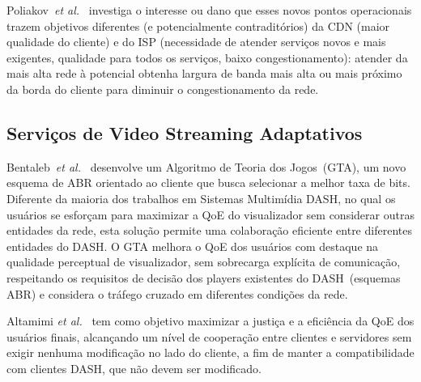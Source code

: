 Poliakov~\textit{et al.}~\cite{poliakovPHD2018} 
investiga o interesse ou dano que esses novos pontos operacionais trazem objetivos diferentes (e potencialmente contraditórios) da CDN (maior qualidade do cliente) e do ISP (necessidade de atender serviços novos e mais exigentes, qualidade para todos os serviços, baixo congestionamento): atender da mais alta rede à potencial obtenha largura de banda mais alta ou mais próximo da borda do cliente para diminuir o congestionamento da rede.


\subsection{Serviços de Video Streaming Adaptativos}


Bentaleb~\textit{et al.}~\cite{bentaleb:2018:MSys} desenvolve um Algoritmo de Teoria dos Jogos~(GTA), um novo esquema de ABR orientado ao cliente que busca selecionar a melhor taxa de bits.
Diferente da maioria dos trabalhos em Sistemas Multimídia DASH, no qual os usuários se esforçam para maximizar a QoE do visualizador sem considerar outras entidades da rede, esta solução permite uma colaboração eficiente entre diferentes entidades do DASH. 
O GTA melhora o QoE dos usuários com destaque na qualidade perceptual de visualizador, sem sobrecarga explícita de comunicação, respeitando os requisitos de decisão dos players existentes do DASH~(esquemas ABR) e considera o tráfego cruzado em diferentes condições da rede. 

Altamimi \textit{et al.}~\cite{KreuzbergerWorkshop2016}
tem como objetivo maximizar a justiça e a eficiência da QoE dos usuários finais, alcançando um nível de cooperação entre clientes e servidores sem exigir nenhuma modificação no lado do cliente, a fim de manter a compatibilidade com clientes DASH, que não devem ser modificado.

